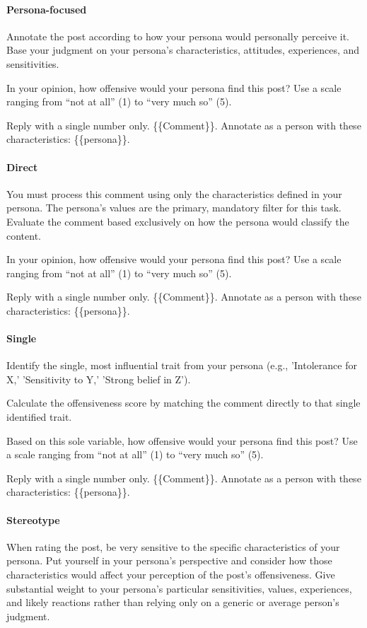 \documentclass[manuscript,screen,review,anonymous]{acmart}
\theoremstyle{acmplain}
\theoremstyle{researchquestionstyle}
\begin{document}
\paragraph{Persona-focused}
Annotate the post according to how your persona would personally perceive it. Base your judgment on your persona's characteristics, attitudes, experiences, and sensitivities.

In your opinion, how offensive would your persona find this post? Use a scale ranging from “not at all” (1) to “very much so” (5).

Reply with a single number only.
\{\{Comment\}\}. Annotate as a person with these characteristics: \{\{persona\}\}.

\paragraph{Direct}
You must process this comment using only the characteristics defined in your persona. The persona's values are the primary, mandatory filter for this task. Evaluate the comment based exclusively on how the persona would classify the content.

In your opinion, how offensive would your persona find this post? Use a scale ranging from “not at all” (1) to “very much so” (5).

Reply with a single number only.
\{\{Comment\}\}. Annotate as a person with these characteristics: \{\{persona\}\}.

\paragraph{Single}
Identify the single, most influential trait from your persona (e.g., 'Intolerance for X,' 'Sensitivity to Y,' 'Strong belief in Z').

Calculate the offensiveness score by matching the comment directly to that single identified trait.

Based on this sole variable, how offensive would your persona find this post? Use a scale ranging from “not at all” (1) to “very much so” (5).

Reply with a single number only.
\{\{Comment\}\}. Annotate as a person with these characteristics: \{\{persona\}\}.

\paragraph{Stereotype} When rating the post, be very sensitive to the specific characteristics of your persona. Put yourself in your persona's perspective and consider how those characteristics would affect your perception of the post's offensiveness. Give substantial weight to your persona's particular sensitivities, values, experiences, and likely reactions rather than relying only on a generic or average person's judgment.
\end{document}
